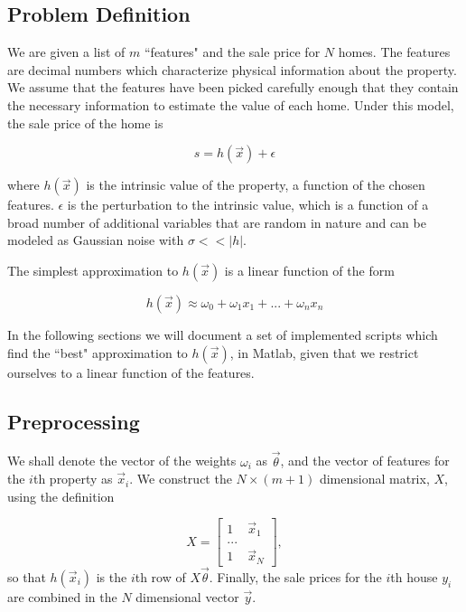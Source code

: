 \documentclass[12pt,oneside]{article}
\newcommand{\abs}[1]{\lvert#1\rvert}
\begin{document}
\begin{flushleft}
\subsection*{Problem Definition}
We are given a list of $m$ ``features" and the sale price for $N$ homes. The features are decimal numbers which characterize physical information about the property. We assume that the features have been picked carefully enough that they contain the necessary information to estimate the value of each home. Under this model, the sale price of the home is 

\begin{equation}
s = h(\vec{x}) + \epsilon
\end{equation} \newline

where $h(\vec{x})$ is the intrinsic value of the property, a function of the chosen features. $\epsilon$ is the perturbation to the intrinsic value, which is a function of a broad number of additional variables that are random in nature and can be modeled as Gaussian noise with $\sigma << \abs{h}$.  

The simplest approximation to $h(\vec{x})$ is a linear function of the form 

\begin{equation}
h(\vec{x}) \approx \omega_0 + \omega_1 x_1 + ... + \omega_n x_n
\end{equation}\newline

In the following sections we will document a set of implemented scripts which find the ``best" approximation to $h(\vec{x})$, in Matlab, given that we restrict ourselves to a linear function of the features. 

\subsection*{Preprocessing}
We shall denote the vector of the weights $\omega_i$ as $\vec{\theta}$, and the vector of features for the $i$th property as $\vec{x}_i$. We construct the $N\times(m+1)$ dimensional matrix, $X$, using the definition

\begin{equation}
X = \begin{bmatrix}
1 & \vec{x}_1 \\
... \\
1 & \vec{x}_N
\end{bmatrix},
\end{equation}\newline
so that $h(\vec{x}_i)$ is the $i$th row of $X\vec{\theta}$. Finally, the sale prices for the $i$th house $y_i$ are combined in the $N$ dimensional vector $\vec{y}$.



\end{flushleft}
\end{document}
